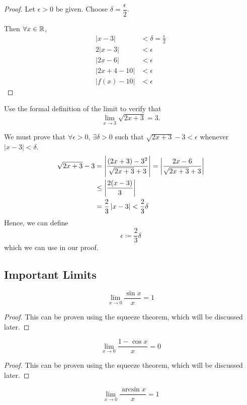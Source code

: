 \begin{proof}
Let $\epsilon > 0$ be given. Choose $\delta = \dfrac{\epsilon}{2}$.

Then $\forall x \in \mathbb R$, 
\begin{align*}
|x-3| &< \delta = \frac{\epsilon}{2} \\
2|x-3| &< \epsilon \\
|2x-6| &< \epsilon \\
|2x+4-10| &< \epsilon \\
|f(x)-10| &< \epsilon
\end{align*}
\end{proof}

\begin{exmp}{}{}
Use the formal definition of the limit to verify that 
\[ \lim_{x \to 3} \sqrt{2x+3} = 3. \]
\end{exmp}

We must prove that $\forall \epsilon > 0$, $\exists \delta > 0$ such that $\sqrt{2x+3} - 3 < \epsilon$ whenever $|x-3|<\delta$.
\begin{align*}
\sqrt{2x+3} - 3 &= \left|\frac{(2x+3)-3^2}{\sqrt{2x+3} + 3}\right| = \left|\frac{2x-6}{\sqrt{2x+3} + 3}\right| \\
&\le \left|\frac{2(x-3)}{3}\right| \\
&= \frac{2}{3} \left|x-3\right| < \frac{2}{3} \delta
\end{align*}
Hence, we can define 
\[ \epsilon \coloneqq \frac{2}{3} \delta \]
which we can use in our proof.
\pagebreak

\subsection{Important Limits}
\begin{equation}
\lim_{x \to 0} \frac{\sin x}{x} = 1
\end{equation}
\begin{proof}
This can be proven using the squeeze theorem, which will be discussed later.
\end{proof}

\begin{equation}
\lim_{x \to 0} \frac{1-\cos x}{x} = 0
\end{equation}
\begin{proof}
This can be proven using the squeeze theorem, which will be discussed later.
\end{proof}

\begin{equation}
\lim_{x\to 0} \frac{\arcsin x}{x} = 1
\end{equation}

